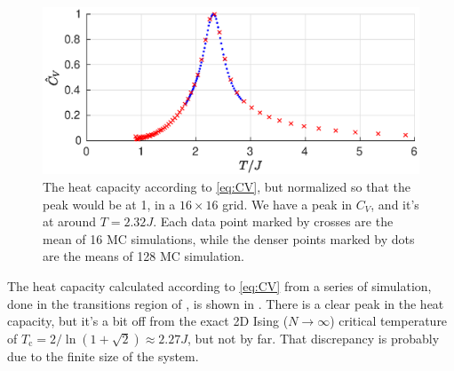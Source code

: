 \documentclass[11pt,letter, swedish, english
]{article}
\newcommand{\Tc}{\ensuremath{T_{\text{c}}}}
\begin{document}
\begin{figure}
\centering
\includegraphics[width=1\textwidth]{CV_L-16_all.eps}
\caption{The heat capacity according to \eqref{eq:CV}, but normalized
  so that the peak would be at 1, in a $16\times16$ grid. We have a
  peak in $C_V$, and it's at around $T=2.32J$.  
  Each data point marked by crosses are the mean of 16 MC simulations,
  while the denser points marked by dots are the means of 128 MC
  simulation. } 
\label{fig:CV1}
\end{figure}


The heat capacity calculated according to \eqref{eq:CV} from a
series of simulation, done in the transitions region of
, is shown in . There is a clear peak
in the heat capacity, but it's a bit off from the exact 2D Ising
($N\to\infty$) critical temperature of 
$\Tc = 2/\ln(1+\sqrt2) \approx 2.27J$, but not by far. That
discrepancy is probably due to the finite size of the system.
\end{document}
